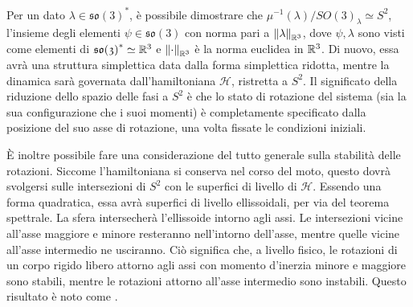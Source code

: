 
Per un dato $\lambda \in \mathfrak{so(3)}^*$, è possibile dimostrare che $\mu^{-1}(\lambda)/SO(3)_{\lambda} \simeq S^2$, l'insieme degli elementi $\psi \in \mathfrak{so(3)}$ con norma pari a $\norm{\lambda}_{\mathbb{R}^3}$, dove $\psi, \lambda$ sono visti come elementi di $\mathfrak{so(3)}^* \simeq \mathbb{R}^3$ e $\norm{\cdot}_{\mathbb{R}^3}$ è la norma euclidea in $\mathbb{R}^3$. Di nuovo, essa avrà una struttura simplettica data dalla forma simplettica ridotta, mentre la dinamica sarà governata dall'hamiltoniana $\mathcal{H}$, ristretta a $S^2$. Il significato della riduzione dello spazio delle fasi a $S^2$ è che lo stato di rotazione del sistema (sia la sua configurazione che i suoi momenti) è completamente specificato dalla posizione del suo asse di rotazione, una volta fissate le condizioni iniziali.

È inoltre possibile fare una considerazione del tutto generale sulla stabilità delle rotazioni. Siccome l'hamiltoniana si conserva nel corso del moto, questo dovrà svolgersi sulle intersezioni di $S^2$ con le superfici di livello di $\mathcal{H}$. Essendo una forma quadratica, essa avrà superfici di livello ellissoidali, per via del teorema spettrale. La sfera intersecherà l'ellissoide intorno agli assi. Le intersezioni vicine all'asse maggiore e minore resteranno nell'intorno dell'asse, mentre quelle vicine all'asse intermedio ne usciranno. Ciò significa che, a livello fisico, le rotazioni di un corpo rigido libero attorno agli assi con momento d'inerzia minore e maggiore sono stabili, mentre le rotazioni attorno all'asse intermedio sono instabili. Questo risultato è noto come .